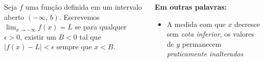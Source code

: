 \begin{frame}
  \begin{columns}[onlytextwidth]
    \begin{column}{0.55\textwidth}\vspace{-0.5cm}
      \begin{definition}
        Seja $f$ uma função definida em um intervalo \\aberto $(-\infty,\,b)$. Escrevemos $\displaystyle\lim_{x\rightarrow -\infty}f(x)=L$ se para qualquer $\epsilon>0$, existir um $B<0$ tal que $|f(x)-L| < \epsilon$ sempre que $x < B$.
      \end{definition}
    \end{column}
    \begin{column}{0.44\textwidth}\vspace{-0.5cm}
      \begin{highlight}
        \textbf{Em outras palavras:}
        \begin{itemize}
          \item A medida com que $x$ decresce sem \emph{cota inferior}, os valores de $y$ permanecem \emph{praticamente inalterados}
        \end{itemize}
      \end{highlight}
    \end{column}
  \end{columns}
  \vspace*{-0.5cm}
  \begin{figure}
  \end{figure}
\end{frame}

